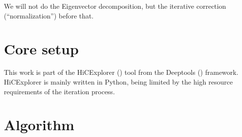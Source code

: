 We will not do the Eigenvector decomposition, but the iterative correction
(``normalization'') before that.


\section{Core setup}\label{sec:setup}



This work is part of the HiCExplorer () tool from the
Deeptools () framework. HiCExplorer is mainly written in
Python, being limited by the high resource requirements of the iteration process.









\section{Algorithm}\label{sec:algorithm}



